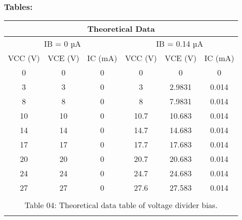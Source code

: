 \documentclass[a4paper, 12pt]{extarticle}
\begin{document}
\subsubsection{Tables:}
\begin{table}[htbp]
  \centering
    \begin{tabular}{cccccc}
    \toprule
    \multicolumn{6}{|c|}{Theoretical Data} \\
    \midrule
    \multicolumn{3}{|c|}{IB = 0 µA} & \multicolumn{3}{c|}{IB = 0.14 µA} \\
    \midrule
    \multicolumn{1}{|c|}{VCC (V)} & \multicolumn{1}{c|}{VCE (V)} & \multicolumn{1}{c|}{IC (mA)} & \multicolumn{1}{c|}{VCC (V)} & \multicolumn{1}{c|}{VCE (V)} & \multicolumn{1}{c|}{IC (mA)} \\
    \midrule
    \multicolumn{1}{|c|}{0} & \multicolumn{1}{c|}{0} & \multicolumn{1}{c|}{0} & \multicolumn{1}{c|}{0} & \multicolumn{1}{c|}{0} & \multicolumn{1}{c|}{0} \\
    \midrule
    \multicolumn{1}{|c|}{3} & \multicolumn{1}{c|}{3} & \multicolumn{1}{c|}{0} & \multicolumn{1}{c|}{3} & \multicolumn{1}{c|}{2.9831} & \multicolumn{1}{c|}{0.014} \\
    \midrule
    \multicolumn{1}{|c|}{8} & \multicolumn{1}{c|}{8} & \multicolumn{1}{c|}{0} & \multicolumn{1}{c|}{8} & \multicolumn{1}{c|}{7.9831} & \multicolumn{1}{c|}{0.014} \\
    \midrule
    \multicolumn{1}{|c|}{10} & \multicolumn{1}{c|}{10} & \multicolumn{1}{c|}{0} & \multicolumn{1}{c|}{10.7} & \multicolumn{1}{c|}{10.683} & \multicolumn{1}{c|}{0.014} \\
    \midrule
    \multicolumn{1}{|c|}{14} & \multicolumn{1}{c|}{14} & \multicolumn{1}{c|}{0} & \multicolumn{1}{c|}{14.7} & \multicolumn{1}{c|}{14.683} & \multicolumn{1}{c|}{0.014} \\
    \midrule
    \multicolumn{1}{|c|}{17} & \multicolumn{1}{c|}{17} & \multicolumn{1}{c|}{0} & \multicolumn{1}{c|}{17.7} & \multicolumn{1}{c|}{17.683} & \multicolumn{1}{c|}{0.014} \\
    \midrule
    \multicolumn{1}{|c|}{20} & \multicolumn{1}{c|}{20} & \multicolumn{1}{c|}{0} & \multicolumn{1}{c|}{20.7} & \multicolumn{1}{c|}{20.683} & \multicolumn{1}{c|}{0.014} \\
    \midrule
    \multicolumn{1}{|c|}{24} & \multicolumn{1}{c|}{24} & \multicolumn{1}{c|}{0} & \multicolumn{1}{c|}{24.7} & \multicolumn{1}{c|}{24.683} & \multicolumn{1}{c|}{0.014} \\
    \midrule
    \multicolumn{1}{|c|}{27} & \multicolumn{1}{c|}{27} & \multicolumn{1}{c|}{0} & \multicolumn{1}{c|}{27.6} & \multicolumn{1}{c|}{27.583} & \multicolumn{1}{c|}{0.014} \\
    \midrule
          &       &       &       &       &  \\
    \multicolumn{6}{c}{Table 04: Theoretical data table of voltage divider bias.} \\
          &       &       &       &       &  \\
    \end{tabular}%
  \label{tab:addlabel}%
\end{table}%
\end{document}
